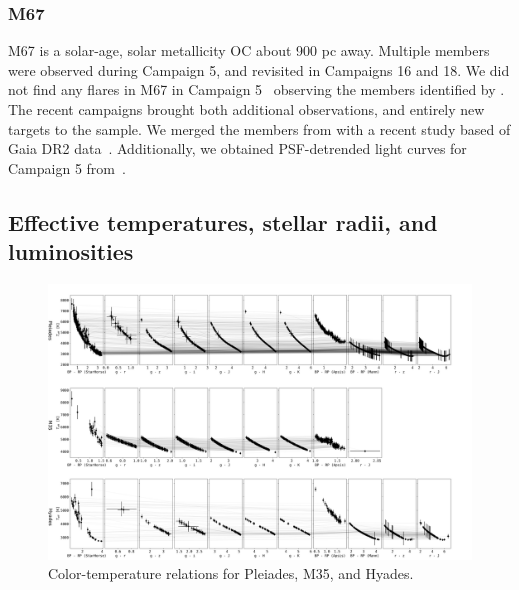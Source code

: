 \documentclass{aa}
\begin{document}
\subsubsection{M67}
M67 is a solar-age, solar metallicity OC about 900 pc away. Multiple members were observed during Campaign 5, and revisited in Campaigns 16 and 18. We did not find any flares in M67 in Campaign 5~ observing the members identified by \citet{gonzalez_m67mem_2016}. The recent campaigns brought both additional observations, and entirely new targets to the sample. We merged the members from \citet{gonzalez_m67mem_2016} with a recent study based of Gaia DR2 data~\citep{gao_m67mem_2018}. Additionally, we obtained PSF-detrended light curves for Campaign 5 from~\citet{nardiello_m67psf_2016}.
\subsection{Effective temperatures, stellar radii, and luminosities}
\label{TeffRL}


   \begin{figure}
		\centering
           \includegraphics[angle=90, width=0.8\hsize]{pics/clusters/pleiades_m35_hyades.pdf}

      \caption{Color-temperature relations for Pleiades, M35, and Hyades.  }
         \label{pleiades_m35_hyades}
   \end{figure}
   
\end{document}
